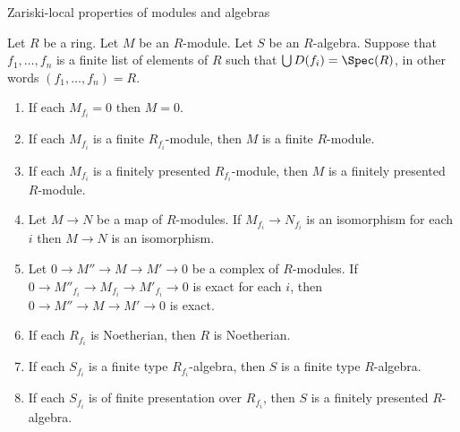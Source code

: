 \begin{lemma}
\label{editorial-source-lemma-cover}
\begin{slogan}
Zariski-local properties of modules and algebras
\end{slogan}
Let $R$ be a ring. Let $M$ be an $R$-module. Let $S$ be an $R$-algebra.
Suppose that $f_1, \ldots, f_n$ is a finite list of
elements of $R$ such that $\bigcup D(f_i) = \Spec(R)$,
in other words $(f_1, \ldots, f_n) = R$.
\begin{enumerate}
\item If each $M_{f_i} = 0$ then $M = 0$.
\item If each $M_{f_i}$ is a finite $R_{f_i}$-module,
then $M$ is a finite $R$-module.
\item If each $M_{f_i}$ is a finitely presented $R_{f_i}$-module,
then $M$ is a finitely presented $R$-module.
\item Let $M \to N$ be a map of $R$-modules. If $M_{f_i} \to N_{f_i}$
is an isomorphism for each $i$ then $M \to N$ is an isomorphism.
\item Let $0 \to M'' \to M \to M' \to 0$ be a complex of $R$-modules.
If $0 \to M''_{f_i} \to M_{f_i} \to M'_{f_i} \to 0$ is exact for each $i$,
then $0 \to M'' \to M \to M' \to 0$ is exact.
\item If each $R_{f_i}$ is Noetherian, then $R$ is Noetherian.
\item If each $S_{f_i}$ is a finite type $R_{f_i}$-algebra, then
$S$ is a finite type $R$-algebra.
\item If each $S_{f_i}$ is of finite presentation over $R_{f_i}$, then
$S$ is a finitely presented $R$-algebra.
\end{enumerate}
\end{lemma}

